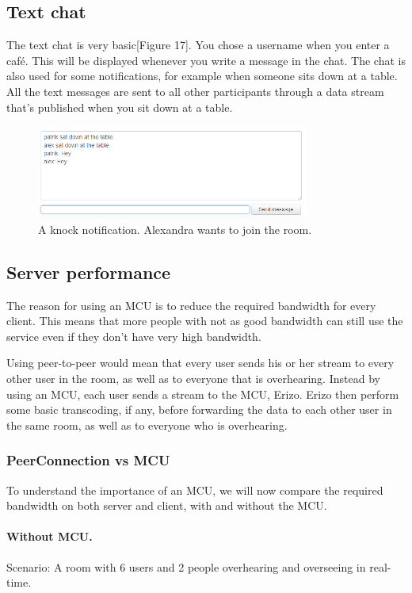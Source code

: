 \documentclass[12pt, titlepage]{article}
\begin{document}
\subsection{Text chat}
The text chat is very basic[Figure 17]. You chose a username when you enter a café. This will be displayed whenever you write a message in the chat. The chat is also used for some notifications, for example when someone sits down at a table. All the text messages are sent to all other participants through a data stream that's published when you sit down at a table.
\begin{figure}[H]
  \centering
	\includegraphics[width=0.8\textwidth,keepaspectratio]{chat.png}
  \caption{A knock notification. Alexandra wants to join the room.}
\end{figure}
\subsection{Server performance}
The reason for using an MCU is to reduce the required bandwidth for every client. This means that more people with not as good bandwidth can still use the service even if they don't have very high bandwidth. 

Using peer-to-peer would mean that every user sends his or her stream to every other user in the room, as well as to everyone that is overhearing. Instead by using an MCU, each user sends a stream to the MCU, Erizo. Erizo then perform some basic transcoding, if any, before forwarding the data to each other user in the same room, as well as to everyone who is overhearing.

\subsubsection{PeerConnection vs MCU}
To understand the importance of an MCU, we will now compare the required bandwidth on both server and client, with and without the MCU.
\paragraph{Without MCU.}
Scenario: A room with 6 users and 2 people overhearing and overseeing in real-time.
\end{document}
